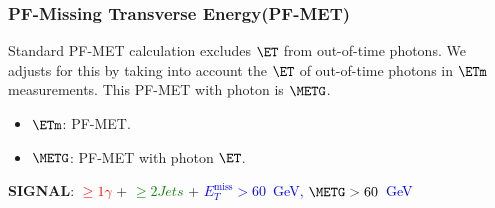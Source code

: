 \documentclass{beamer}
\begin{document}
\begin{frame}
\frametitle{PF-Missing Transverse Energy(PF-MET)}

\begin{tcolorbox}[colback=UNL@Cream!5,colframe=UMN@Maroon!40,title=\textcolor{UMN@Maroon}{\textbf{PF-Missing Transverse Energy($\ETm$)}}]
Standard PF-MET calculation excludes $\ET$ from out-of-time photons.
We adjusts for this by taking into account the $\ET$ of out-of-time photons in $\ETm$ measurements. This  PF-MET with photon is \textcolor{blue}{ $\METG$}.
  \begin{itemize}
    \item $\mathbf{\ETm}$: PF-MET.
    \item $\mathbf{\METG}$: PF-MET with photon $\ET$.
  \end{itemize}
\end{tcolorbox}

  \begin{tcolorbox}[colback=UNL@Cream!5,colframe=UMN@Maroon!40,title=\textcolor{UMN@Maroon}{\textbf{Signal Selection Criteria}}]
\textcolor{UMN@Maroon}{\textbf{SIGNAL}}: \textcolor{red}{$\geq 1 \gamma$}  + \textcolor{green}{$\geq 2 Jets$} + \textcolor{blue}{$E^{\mbox{miss}}_{T} > 60$~GeV, $\METG > 60$~GeV}
   \end{tcolorbox}
\end{frame}
\end{document}
